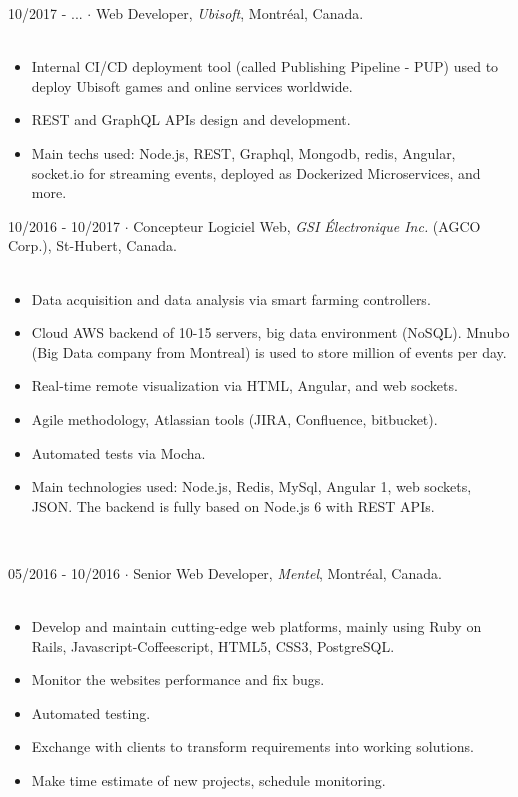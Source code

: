 \documentclass{cv}
\begin{document}
\begin{formation}

\item[10/2017 - ...]
     $\cdot$ Web Developer, \textit{Ubisoft}, Montr\'eal, Canada. \\ ~\\

 \begin{itemize}
     \item Internal CI/CD deployment tool (called Publishing Pipeline - PUP) used to deploy Ubisoft games and online services worldwide.
     \item REST and GraphQL APIs design and development.
     \item Main techs used: Node.js, REST, Graphql, Mongodb, redis, Angular, socket.io for streaming events, deployed as Dockerized Microservices, and more.
 \end{itemize}

\item[10/2016 - 10/2017]
     $\cdot$ Concepteur Logiciel Web, \textit{GSI \'Electronique Inc.} (AGCO Corp.), St-Hubert, Canada. \\ ~\\

 \begin{itemize}
     \item Data acquisition and data analysis via smart farming controllers.
     \item Cloud AWS backend of 10-15 servers, big data environment (NoSQL). Mnubo (Big Data company from Montreal) is used to store million of events per day.
     \item Real-time remote visualization via HTML, Angular, and web sockets.
     \item Agile methodology, Atlassian tools (JIRA, Confluence, bitbucket).
     \item Automated tests via Mocha.
     \item Main technologies used: Node.js, Redis, MySql, Angular 1, web sockets, JSON. The backend is fully based on Node.js 6 with REST APIs.
 \end{itemize}

~\newpage

	\item[05/2016 - 10/2016]
     $\cdot$ Senior Web Developer, \textit{Mentel}, Montr\'eal, Canada. \\ ~\\

 \begin{itemize}
     \item Develop and maintain cutting-edge web platforms, mainly using Ruby on Rails, Javascript-Coffeescript, HTML5, CSS3, PostgreSQL.
     \item Monitor the websites performance and fix bugs.
     \item Automated testing.
     \item Exchange with clients to transform requirements into working solutions.
     \item Make time estimate of new projects, schedule monitoring.
 \end{itemize}


\end{formation}
\end{document}
